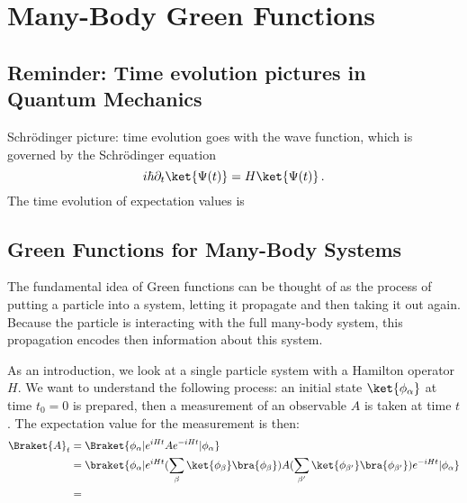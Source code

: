 \documentclass[../classnotes.tex]{subfiles}
\begin{document}
\chapter{Many-Body Green Functions}

\section{Reminder: Time evolution pictures in Quantum Mechanics}

Schrödinger picture: time evolution goes with the wave function, which is governed by the Schrödinger equation
\begin{equation}
    i \hbar \partial_t \ket{\Psi(t)} = H \ket{\Psi(t)}\,.
\end{equation}
The time evolution of expectation values is

\section{Green Functions for Many-Body Systems}

The fundamental idea of Green functions can be thought of as the process of putting a particle into a system, letting it propagate and then taking it out again.
Because the particle is interacting with the full many-body system, this propagation encodes then information about this system.

As an introduction, we look at a single particle system with a Hamilton operator \(H\).
We want to understand the following process: an initial state \(\ket{\phi_{\alpha}}\) at time \(t_0 = 0\) is prepared, then a measurement of an observable \(A\) is taken at time \(t\).
The expectation value for the measurement is then:
\begin{align}
    \Braket{A}_t &= \Braket{\phi_{\alpha} | e^{i H t} A e^{- i H t} | \phi_{\alpha}} \\
    &= \braket{\phi_{\alpha} | e^{i H t} (\sum_{\beta} \ket{\phi_{\beta}} \bra{\phi_{\beta}}) A (\sum_{\beta^{\prime}} \ket{\phi_{\beta^{\prime}}} \bra{\phi_{\beta^{\prime}}}) e^{- i H t} | \phi_{\alpha}} \\
    &= 
\end{align}
\end{document}

